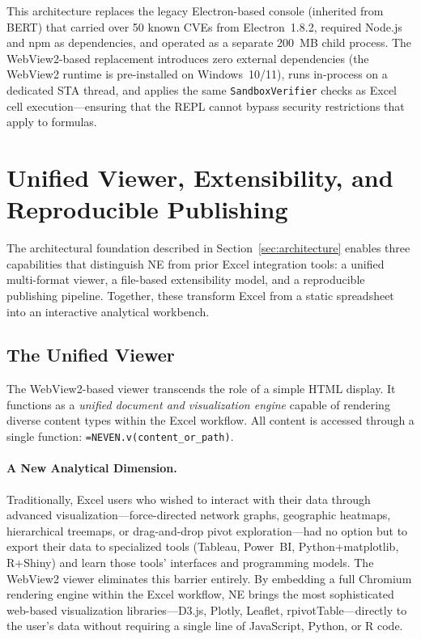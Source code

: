 \documentclass[preprint,12pt,authoryear]{elsarticle}
\newcommand{\neven}{NE\raisebox{0.2ex}{v}\rotatebox[origin=c]{180}{E}\rotatebox[origin=c]{180}{N}}
\begin{document}
This architecture replaces the legacy Electron-based console (inherited from BERT) that carried over 50 known CVEs from Electron~1.8.2, required Node.js and npm as dependencies, and operated as a separate 200~MB child process. The WebView2-based replacement introduces zero external dependencies (the WebView2 runtime is pre-installed on Windows~10/11), runs in-process on a dedicated STA thread, and applies the same \texttt{SandboxVerifier} checks as Excel cell execution---ensuring that the REPL cannot bypass security restrictions that apply to formulas.


\section{Unified Viewer, Extensibility, and Reproducible Publishing}
\label{sec:viewer_extensibility}

The architectural foundation described in Section~\ref{sec:architecture} enables three capabilities that distinguish \neven{} from prior Excel integration tools: a unified multi-format viewer, a file-based extensibility model, and a reproducible publishing pipeline. Together, these transform Excel from a static spreadsheet into an interactive analytical workbench.

\subsection{The Unified Viewer}

The WebView2-based viewer transcends the role of a simple HTML display. It functions as a \emph{unified document and visualization engine} capable of rendering diverse content types within the Excel workflow. All content is accessed through a single function: \texttt{=NEVEN.v(content\_or\_path)}.

\paragraph{A New Analytical Dimension.}
Traditionally, Excel users who wished to interact with their data through advanced visualization---force-directed network graphs, geographic heatmaps, hierarchical treemaps, or drag-and-drop pivot exploration---had no option but to export their data to specialized tools (Tableau, Power~BI, Python+matplotlib, R+Shiny) and learn those tools' interfaces and programming models. The WebView2 viewer eliminates this barrier entirely. By embedding a full Chromium rendering engine within the Excel workflow, \neven{} brings the most sophisticated web-based visualization libraries---D3.js, Plotly, Leaflet, rpivotTable---directly to the user's data without requiring a single line of JavaScript, Python, or R code.
\end{document}
